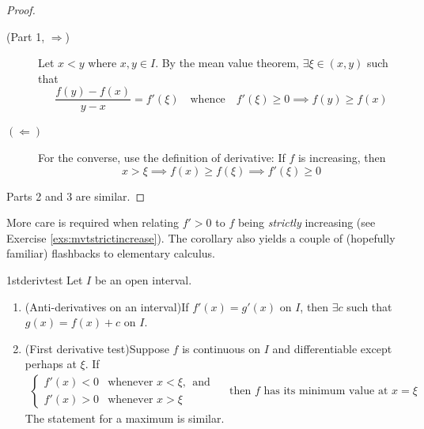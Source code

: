 \goodbreak

\begin{proof}
	\begin{description}
		\item[\normalfont (Part 1, $\Rightarrow$)] Let $x<y$ where $x,y\in I$. By the mean value theorem, $\exists\xi\in(x,y)$ such that
		\[
			\frac{f(y)-f(x)}{y-x}=f'(\xi)
			\quad\text{whence}\quad 
			f'(\xi)\ge 0\implies f(y)\ge f(x)
		\]
		\item[$(\Leftarrow)$] For the converse, use the definition of derivative:  If $f$ is increasing, then
		\[
			x>\xi\implies f(x)\ge f(\xi)\implies f'(\xi)\ge 0
		\]
	\end{description}
	Parts 2 and 3 are similar.
\end{proof}

More care is required when relating $f'>0$ to $f$ being \emph{strictly} increasing (see Exercise \ref{exs:mvtstrictincrease}). The corollary also yields a couple of (hopefully familiar) flashbacks to elementary calculus.

\begin{cor}{}{1stderivtest}
	Let $I$ be an open interval.
	\begin{enumerate}\itemsep0pt
	  \item (Anti-derivatives on an interval)\quad If $f'(x)=g'(x)$ on $I$, then $\exists c$ such that $g(x)=f(x)+c$ on $I$.
	  \item (First derivative test)\quad Suppose $f$ is continuous on $I$ and differentiable except perhaps at $\xi$. If
		\begin{gather*}
			\begin{cases}
			f'(x)<0&\text{whenever }x<\xi,\ \ \text{and}\\
			f'(x)>0&\text{whenever }x>\xi
			\end{cases}\quad \text{ then $f$ has its minimum value at $x=\xi$}
		\end{gather*}
		The statement for a maximum is similar.
	\end{enumerate}
\end{cor}


